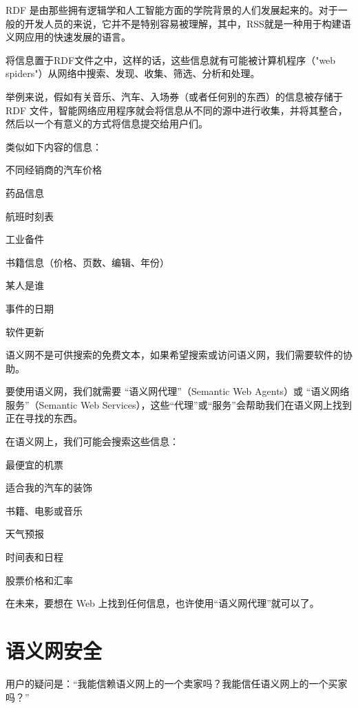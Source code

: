 RDF 是由那些拥有逻辑学和人工智能方面的学院背景的人们发展起来的。对于一般的开发人员的来说，它并不是特别容易被理解，其中，RSS就是一种用于构建语义网应用的快速发展的语言。

将信息置于RDF文件之中，这样的话，这些信息就有可能被计算机程序（"web spiders"）从网络中搜索、发现、收集、筛选、分析和处理。


举例来说，假如有关音乐、汽车、入场券（或者任何别的东西）的信息被存储于 RDF 文件，智能网络应用程序就会将信息从不同的源中进行收集，并将其整合，然后以一个有意义的方式将信息提交给用户们。


类似如下内容的信息：

\begin{compactitem}
\item 不同经销商的汽车价格
\item 药品信息
\item 航班时刻表
\item 工业备件
\item 书籍信息（价格、页数、编辑、年份）
\item 某人是谁
\item 事件的日期
\item 软件更新
\end{compactitem}


语义网不是可供搜索的免费文本，如果希望搜索或访问语义网，我们需要软件的协助。

要使用语义网，我们就需要 “语义网代理”（Semantic Web Agents）或 “语义网络服务”（Semantic Web Services），这些“代理”或“服务”会帮助我们在语义网上找到正在寻找的东西。

在语义网上，我们可能会搜索这些信息：

\begin{compactitem}
\item 最便宜的机票
\item 适合我的汽车的装饰
\item 书籍、电影或音乐
\item 天气预报
\item 时间表和日程
\item 股票价格和汇率
\end{compactitem}

在未来，要想在 Web 上找到任何信息，也许使用“语义网代理”就可以了。


\section{语义网安全}

用户的疑问是：“我能信赖语义网上的一个卖家吗？我能信任语义网上的一个买家吗？”

